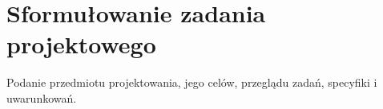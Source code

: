 \section{Sformułowanie zadania projektowego}
Podanie przedmiotu projektowania, jego celów,
przeglądu zadań, specyfiki i uwarunkowań.